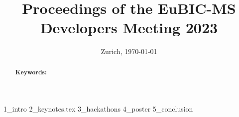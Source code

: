 \documentclass[11pt,a4paper,DIV21,abstracton]{scrartcl}
\title{Proceedings of the EuBIC-MS Developers Meeting 2023}
\author{
	
}
\date{{\small Zurich, \today}}
\begin{document}
\maketitle
\begin{abstract}
	
	\vspace{0.5cm}
	\textbf{Keywords:
	}
	
\end{abstract}


 {1_intro}
 {2_keynotes.tex}
 {3_hackathons}
 {4_poster}
 {5_conclusion}




\end{document}
